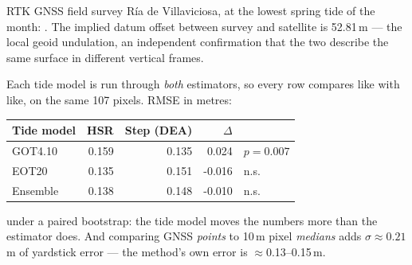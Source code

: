 \begin{pblock}{RTK GNSS field survey}
Ría de Villaviciosa, at the lowest spring tide of the month:
. The implied datum offset between survey
and satellite is 52.81\,m — the local geoid undulation, an independent
confirmation that the two describe the same surface in different vertical
frames.

\vspace{3mm}
Each tide model is run through \emph{both} estimators, so every row compares
like with like, on the same 107 pixels. RMSE in metres:

\vspace{2mm}
\begin{tabular}{@{}l r r r l@{}}
\toprule
Tide model & {HSR} & {Step (DEA)} & {$\Delta$} & \\
\midrule
GOT4.10   & 0.159 & 0.135 &  0.024 & $p=0.007$ \\
EOT20     & 0.135 & 0.151 & -0.016 & n.s. \\
Ensemble  & 0.138 & 0.148 & -0.010 & n.s. \\
\bottomrule
\end{tabular}

\vspace{3mm}
\begin{pcallout}
 under a paired bootstrap:
the tide model moves the numbers more than the estimator does. And
comparing GNSS \emph{points} to 10\,m pixel \emph{medians} adds
$\sigma\!\approx\!0.21$\,m of yardstick error — the method's own error is
$\approx$0.13--0.15\,m.
\end{pcallout}

\end{pblock}

